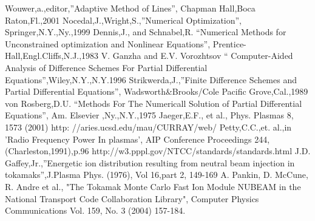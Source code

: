    \normalsize
       

 \begin{thebibliography}{99}
         Wouwer,a.,editor,''Adaptive Method of Lines'',
          Chapman Hall,Boca Raton,Fl.,2001
         Nocedal,J.,Wright,S.,''Numerical Optimization'',
          Springer,N.Y.,Ny.,1999
         Dennis,J., and Schnabel,R. ``Numerical Methods for
           Unconstrained optimization and Nonlinear Equations'',
           Prentice-Hall,Engl.Cliffs,N.J.,1983
         V. Ganzha and E.V. Vorozhtsov `` Computer-Aided
           Analysis of Difference Schemes For Partial Differential
           Equations'',Wiley,N.Y.,N.Y.1996
         Strikwerda,J.,''Finite Difference Schemes and 
           Partial Differential Equations'', Wadsworth\&Brooks/Cole
           Pacific Grove,Cal.,1989
         von Rosberg,D.U. ``Methods For The Numericall
           Solution of Partial Differential Equations'',
           Am. Elsevier ,Ny.,N.Y.,1975
 Jaeger,E.F., et al., Phys. Plasmas 8, 1573 (2001)
  http: //aries.ucsd.edu/mau/CURRAY/web/
  Petty,C.C.,et. al.,in 'Radio Frequency Power In plasmas',
              AIP Conference Proceedings 244, (Charleston,1991),p.96
  http://w3.pppl.gov/NTCC/standards/standards.html
      J.D. Gaffey,Jr.,''Energetic ion distribution resulting from
      neutral beam injection in tokamaks'',J.Plasma Phys. (1976),
      Vol 16,part 2, 149-169
A. Pankin, D. McCune, R. Andre et al., "The Tokamak Monte Carlo Fast
Ion Module NUBEAM in the National Transport Code Collaboration Library",
Computer Physics Communications Vol. 159, No. 3 (2004) 157-184.
\end{thebibliography}
